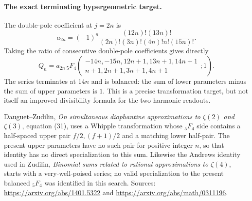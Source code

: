 \paragraph{The exact terminating hypergeometric target.}
The double-pole coefficient at $j=2n$ is
\[
 a_{2n}=(-1)^n\frac{(12n)!(13n)!}
 {(2n)!(3n)!(4n)!n!(15n)!}.
\]
Taking the ratio of consecutive double-pole coefficients gives directly
\[
 Q_n=a_{2n}\,{}_5F_4\left(
 \begin{matrix}-14n,-15n,12n+1,13n+1,14n+1\\
 n+1,2n+1,3n+1,4n+1\end{matrix};1\right).
\]
The series terminates at $14n$ and is balanced: the sum of lower
parameters minus the sum of upper parameters is $1$.
This is a precise transformation target, but not itself an improved
divisibility formula for the two harmonic readouts.

Dauguet--Zudilin, \emph{On simultaneous diophantine approximations to
$\zeta(2)$ and $\zeta(3)$}, equation (31), uses a Whipple transformation
whose ${}_5F_4$ side contains a half-spaced upper pair $f/2,(f+1)/2$ and
a matching lower half-pair. The present upper parameters have no such
pair for positive integer $n$, so that identity has no direct
specialization to this sum. Likewise the Andrews identity used in
Zudilin, \emph{Binomial sums related to rational approximations to
$\zeta(4)$}, starts with a very-well-poised series; no valid specialization
to the present balanced ${}_5F_4$ was identified in this search.
Sources: \url{https://arxiv.org/abs/1401.5322} and
\url{https://arxiv.org/abs/math/0311196}.
